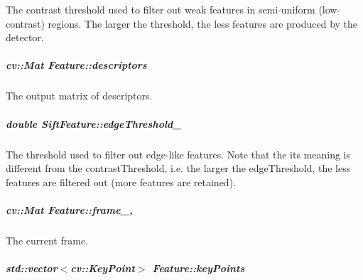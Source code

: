 The contrast threshold used to filter out weak features in semi-\/uniform (low-\/contrast) regions. The larger the threshold, the less features are produced by the detector. 

\hypertarget{group___feature_extractor_a857c4955b0325d8b96c863d873bf8db5}{
\subparagraph[{descriptors}]{\setlength{\rightskip}{0pt plus 5cm}cv\-::\-Mat Feature\-::descriptors\hspace{0.3cm}{\ttfamily [inherited]}}}\label{group___feature_extractor_a857c4955b0325d8b96c863d873bf8db5}


The output matrix of descriptors. 

\hypertarget{group___feature_extractor_a8fc64eb5826c05c5fe8c0893cc24ff0a}{
\subparagraph[{edge\-Threshold\-\_\-}]{\setlength{\rightskip}{0pt plus 5cm}double Sift\-Feature\-::edge\-Threshold\-\_\-\hspace{0.3cm}{\ttfamily [private]}}}\label{group___feature_extractor_a8fc64eb5826c05c5fe8c0893cc24ff0a}


The threshold used to filter out edge-\/like features. Note that the its meaning is different from the contrast\-Threshold, i.\-e. the larger the edge\-Threshold, the less features are filtered out (more features are retained). 

\hypertarget{group___feature_extractor_aa805e6fee8eeec2061feabe29430f0df}{
\subparagraph[{frame\-\_\-}]{\setlength{\rightskip}{0pt plus 5cm}cv\-::\-Mat Feature\-::frame\-\_\-\hspace{0.3cm}{\ttfamily [protected]}, {\ttfamily [inherited]}}}\label{group___feature_extractor_aa805e6fee8eeec2061feabe29430f0df}


The current frame. 

\hypertarget{group___feature_extractor_ac666ae973c3840be1b3b9183dd12b8c1}{
\subparagraph[{key\-Points}]{\setlength{\rightskip}{0pt plus 5cm}std\-::vector$<$cv\-::\-Key\-Point$>$ Feature\-::key\-Points\hspace{0.3cm}{\ttfamily [inherited]}}}\label{group___feature_extractor_ac666ae973c3840be1b3b9183dd12b8c1}


